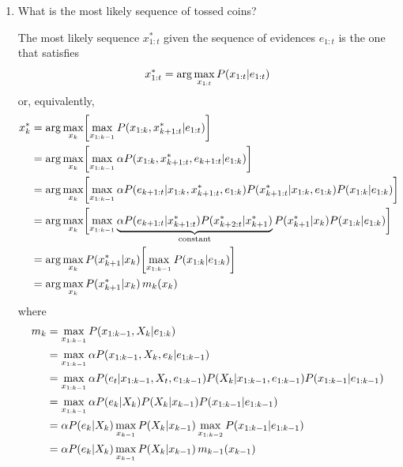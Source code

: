 \documentclass[11pt, a4paper]{article}
\begin{document}
\begin{enumerate}
    \item What is the most likely sequence of tossed coins?

    \begin{solution}
        The most likely sequence $x_{1:t}^*$ given the sequence of evidences $e_{1:t}$ is the one that satisfies
        \begin{equation*}
            x_{1:t}^* = \arg \max_{x_{1:t}} P(x_{1:t} \vert e_{1:t})
        \end{equation*}
        or, equivalently,
        \begin{align*}
            x_k^* & = \arg \max_{x_k} \sbk*{ \max_{x_{1:k-1}} P(x_{1:k}, x^*_{k+1:t} \knowing e_{1:t}) } \\
            & = \arg \max_{x_k} \sbk*{ \max_{x_{1:k-1}} \alpha P(x_{1:k}, x^*_{k+1:t}, e_{k+1:t} \knowing e_{1:k}) } \\
            & = \arg \max_{x_k} \sbk*{ \max_{x_{1:k-1}} \alpha P(e_{k+1:t} \knowing x_{1:k}, x^*_{k+1:t}, e_{1:k}) P(x^*_{k+1:t} \knowing x_{1:k}, e_{1:k}) P(x_{1:k} \knowing e_{1:k}) } \\
            & = \arg \max_{x_k} \sbk[\bigg]{ \max_{x_{1:k-1}} \underbrace{\alpha P(e_{k+1:t} \knowing x^*_{k+1:t}) P(x^*_{k+2:t} \knowing x^*_{k+1})}_{\text{constant}} P(x^*_{k+1} \knowing x_{k}) P(x_{1:k} \knowing e_{1:k}) } \\
            & = \arg \max_{x_k} P(x^*_{k+1} \knowing x_{k}) \sbk*{ \max_{x_{1:k-1}} P(x_{1:k} \knowing e_{1:k}) } \\
            & = \arg \max_{x_k} P(x^*_{k+1} \knowing x_{k}) \, m_k(x_k)
        \end{align*}
        where
        \begin{align*}
            m_k & = \max_{x_{1:k-1}} P(x_{1:k-1}, X_k \knowing e_{1:k}) \\
            & = \max_{x_{1:k-1}} \alpha P(x_{1:k-1}, X_k, e_k \knowing e_{1:k-1}) \\
            & = \max_{x_{1:k-1}} \alpha P(e_t \knowing x_{1:k-1}, X_t, e_{1:k-1}) P(X_k \knowing x_{1:k-1}, e_{1:k-1}) P(x_{1:k-1} \knowing e_{1:k-1}) \\
            & = \max_{x_{1:k-1}} \alpha P(e_k \knowing X_k) P(X_k \knowing x_{k-1}) P(x_{1:k-1} \knowing e_{1:k-1}) \\
            & = \alpha P(e_k \knowing X_k) \max_{x_{k-1}} P(X_k \knowing x_{k-1}) \max_{x_{1:k - 2}} P(x_{1:k-1} \knowing e_{1:k-1}) \\
            & = \alpha P(e_k \knowing X_k) \max_{x_{k-1}} P(X_k \knowing x_{k-1}) \, m_{k-1}(x_{k-1})

\end{align*}
\end{solution}
\end{enumerate}
\end{document}
